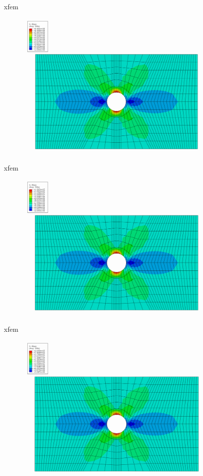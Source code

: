 \documentclass[10pt]{beamer}
\begin{document}
	\begin{frame}{xfem}
		\begin{figure}
			\centering
			\includegraphics[width=0.9\linewidth]{../Figures/xfem2}
		\end{figure}
	\end{frame}
	
	\begin{frame}{xfem}
		\begin{figure}
			\centering
			\includegraphics[width=0.9\linewidth]{../Figures/xfem3}
		\end{figure}
	\end{frame}
	
	\begin{frame}{xfem}
		\begin{figure}
			\centering
			\includegraphics[width=0.9\linewidth]{../Figures/xfem4}
		\end{figure}
	\end{frame}
	
\end{document}

